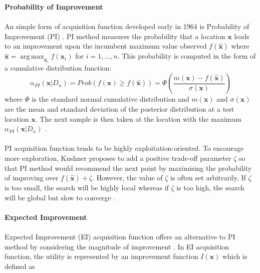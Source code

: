 \documentclass[a4paper,11pt]{report}
\DeclareMathOperator*{\argmax}{arg\,max}
\begin{document}
\textbf{{Probability of Improvement}}
\\\\
An simple form of acquisition function developed early in 1964 is Probability of Improvement (PI) \cite{kushner1964new}. PI method measures the probability that a location $\mathbf{x}$ leads to an improvement upon the incumbent maximum value observed  $f(\mathbf{\hat{x}})$ where $\mathbf{\hat{x}}=\argmax_{\mathbf{x}_{i}} f(\mathbf{x}_{i})$ for $i=1, \dots, n$. This probability is computed in the form of a cumulative distribution function\cite{brochu2010tutorial}: 
	\begin{equation}
	\alpha_{PI}(\mathbf{x} \vert D_n) = Prob(f(\mathbf{x})\geq f(\mathbf{\hat{x}}))=\Phi \left (\dfrac{ m (\mathbf{x})-f(\mathbf{\hat{x}})}{\sigma(\mathbf{x})} \right) 
	\end{equation}
where $\Phi$ is the standard normal cumulative distribution and $m (\mathbf{x}) $ and $\sigma(\mathbf{x})$ are the mean and standard deviation of the posterior distribution at a test location $\mathbf{x}$. The next sample is then taken at the location with the maximum $\alpha_{PI}(\mathbf{x} \vert D_n) $ .
\\\\
PI acquisition function tends to be highly exploitation-oriented. To encourage more exploration, Kushner \cite{kushner1964new} proposes to add a positive trade-off parameter $\zeta $ so that PI method would recommend the next point by maximising the probability of improving over $f(\mathbf{\hat{x}})+ \zeta$. However, the value of $\zeta$ is often set arbitrarily. If $\zeta$ is too small, the search will be highly local whereas if $\zeta$ is too high, the search will be global but slow to converge \cite{jones2001taxonomy}.
\\\\	
\textbf{Expected Improvement}
\\\\
Expected Improvement (EI) acquisition function offers an alternative to PI method by considering the magnitude of improvement\cite{dixon1978towards} \cite{jones1998efficient}. In EI acquisition function, the utility is represented by an improvement function $I(\mathbf{x})$ which is defined as
\end{document}
